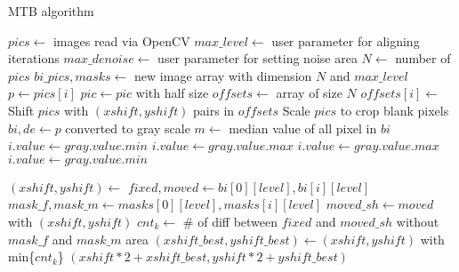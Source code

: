 \begin{algorithm}
\caption{MTB algorithm \cite{ref:Ward}}
\begin{algorithmic}[1]
\State $pics\gets$ images read via OpenCV
\State $max\_level\gets$ user parameter for aligning iterations
\State $max\_denoise\gets$ user parameter for setting noise area
	\State $N\gets$ number of $pics$
	\State $bi\_pics, masks\gets$ new image array with dimension $N$ and $max\_level$
		\State $p\gets pics[i]$
			\State {}
			\State $pic\gets pic$ with half size
		\EndFor
	\EndFor
	\State $offsets\gets$ array of size $N$
		\State $offsets[i]\gets$
	\EndFor
	\State Shift $pics$ with $(xshift, yshift)$ pairs in $offsets$
	\State Scale $pics$ to crop blank pixels
\EndFunction
\Statex
{}
	\State $bi, de\gets p$ converted to gray scale
	\State $m\gets$ median value of all pixel in $bi$
			\State $i.value\gets gray.value.min$
		\Else
			\State $i.value\gets gray.value.max$
		\EndIf
	\EndFor
			\State $i.value\gets gray.value.max$
		\Else
			\State $i.value\gets gray.value.min$
		\EndIf
	\EndFor
\EndFunction
{}
\end{algorithmic}
\end{algorithm}

\begin{algorithm}
\begin{algorithmic}[1]
		\State {}
	\EndIf
	\State $(xshift, yshift)\gets$
	\State $fixed, moved\gets bi[0][level], bi[i][level]$
	\State $mask\_f, mask\_m\gets masks[0][level], masks[i][level]$
		\State $moved\_sh\gets moved$ with $(xshift, yshift)$
		\State $cnt_k\gets$ \# of diff between $fixed$ and $moved\_sh$
without $mask\_f$ and $mask\_m$ area	
	\EndFor
	\State $(xshift\_best, yshift\_best)\gets(xshift, yshift)$ with min\{$cnt_k$\}
	\State\Return$(xshift*2+xshift\_best, yshift*2+yshift\_best)$
\EndFunction
\end{algorithmic}
\end{algorithm}